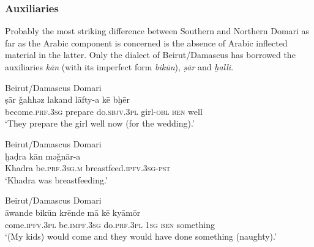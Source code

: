 \documentclass[output=paper]{langsci/langscibook}
\begin{document}
 \subsubsection{Auxiliaries}

Probably the most striking difference between Southern and Northern Domari as far as the Arabic component is concerned is the absence of Arabic inflected material in the latter. Only the dialect of Beirut/Damascus has borrowed the auxiliaries \textit{kān} (with its imperfect form \textit{bikūn}), \textit{ṣār} and \textit{ḫalli}.

\ea
{Beirut/Damascus Domari}\\ \label{sar}
\gll ṣār \v{g}ahhəz lakand lāfty-a kē bḫēr\\
     become.\textsc{prf.3sg} prepare do\textsc{.sbjv.3pl} girl\textsc{{}-obl} \textsc{ben} well\\
\glt ‘They prepare the girl well now (for the wedding).’
\z

\ea \label{xadra}
{Beirut/Damascus Domari}\\
\gll ḫaḍra kān mə\v{g}nār-a\\
     Khadra be.\textsc{prf.3sg.m} breastfeed.\textsc{ipfv.3sg-pst}\\
\glt ‘Khadra was breastfeeding.’
\z

\ea \label{awande}
{Beirut/Damascus Domari}\\
\gll āwande bikūn krēnde mā kē kyāmōr\\
     come.\textsc{ipfv.3pl} be.\textsc{impf.3sg} do.\textsc{prf.3pl} \textsc{1sg} \textsc{ben} something\\
\glt ‘(My kids) would come and they would have done something (naughty).’ 
\z
\end{document}
